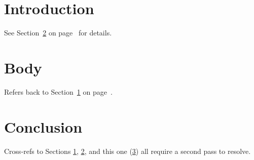 \documentclass[12pt]{article}
\begin{document}
\tableofcontents

\section{Introduction}\label{sec:intro}

See Section~\ref{sec:body} on page~\pageref{sec:body} for details.

\section{Body}\label{sec:body}

Refers back to Section~\ref{sec:intro} on page~\pageref{sec:intro}.

\section{Conclusion}\label{sec:end}

Cross-refs to Sections \ref{sec:intro}, \ref{sec:body}, and this one
(\ref{sec:end}) all require a second pass to resolve.
\end{document}
